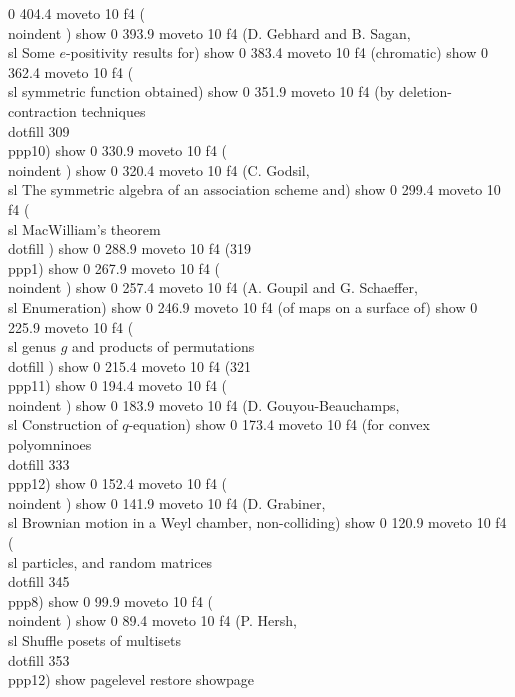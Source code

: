 0 404.4 moveto
10 f4
(\\noindent     ) show
0 393.9 moveto
10 f4
(D. Gebhard and B. Sagan,  {\\sl Some $e$-positivity results for) show
0 383.4 moveto
10 f4
(chromatic}) show
0 362.4 moveto
10 f4
({\\sl  symmetric function obtained) show
0 351.9 moveto
10 f4
(by deletion-contraction techniques}\\dotfill   309\\ppp{10}) show
0 330.9 moveto
10 f4
(\\noindent     ) show
0 320.4 moveto
10 f4
(C. Godsil,  {\\sl The symmetric algebra of an association scheme and}) show
0 299.4 moveto
10 f4
({\\sl MacWilliam's theorem}\\dotfill  ) show
0 288.9 moveto
10 f4
(319\\ppp{1}) show
0 267.9 moveto
10 f4
(\\noindent     ) show
0 257.4 moveto
10 f4
(A. Goupil and G. Schaeffer,  {\\sl Enumeration) show
0 246.9 moveto
10 f4
(of maps on a surface of}) show
0 225.9 moveto
10 f4
({\\sl genus $g$ and products of permutations}\\dotfill  ) show
0 215.4 moveto
10 f4
(321\\ppp{11}) show
0 194.4 moveto
10 f4
(\\noindent     ) show
0 183.9 moveto
10 f4
(D. Gouyou-Beauchamps,  {\\sl Construction of $q$-equation) show
0 173.4 moveto
10 f4
(for convex polyomninoes}\\dotfill   333\\ppp{12}) show
0 152.4 moveto
10 f4
(\\noindent ) show
0 141.9 moveto
10 f4
(D. Grabiner, {\\sl Brownian motion in a Weyl chamber, non-colliding}) show
0 120.9 moveto
10 f4
({\\sl particles, and random matrices}\\dotfill 345\\ppp{8}) show
0 99.9 moveto
10 f4
(\\noindent ) show
0 89.4 moveto
10 f4
(P. Hersh, {\\sl Shuffle posets of multisets}\\dotfill 353\\ppp{12}) show
pagelevel restore
showpage
